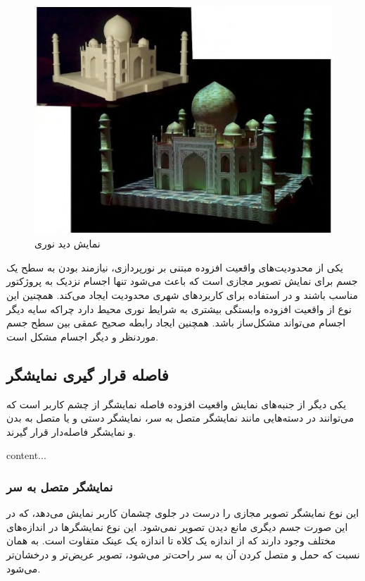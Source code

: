 \begin{figure}
	\centering
	\includegraphics[width=1\linewidth]{image/tajmahal}
	\caption {نمایش دید نوری \cite{Mistry}}
	\label{fig:tajmahal}
\end{figure}

یکی از محدودیت‌های واقعیت افزوده مبتنی بر نورپردازی، نیازمند بودن به سطح یک جسم برای نمایش تصویر مجازی است که باعث می‌شود تنها اجسام نزدیک به پروژکتور مناسب باشند و در استفاده برای کاربردهای شهری محدودیت ایجاد می‌کند. همچنین این نوع از واقعیت افزوده وابستگی بیشتری به شرایط نوری محیط دارد چراکه سایه دیگر اجسام می‌تواند مشکل‌ساز باشد. همچنین ایجاد رابطه صحیح عمقی بین سطح جسم موردنظر و دیگر اجسام مشکل است.

\subsection{فاصله قرار گیری نمایشگر}
یکی دیگر از جنبه‌های نمایش واقعیت افزوده فاصله نمایشگر از چشم کاربر است که می‌توانند در دسته‌هایی مانند نمایشگر متصل به سر، نمایشگر دستی و یا متصل به بدن و نمایشگر فاصله‌دار قرار گیرند.

	content...

\subsubsection{نمایشگر متصل به سر}
این نوع نمایشگر تصویر مجازی را درست در جلوی چشمان کاربر نمایش می‌دهد، که در این صورت جسم دیگری مانع دیدن تصویر نمی‌شود. این نوع نمایشگرها در اندازه‌های مختلف وجود دارند که از اندازه یک کلاه تا اندازه یک عینک متفاوت است. به همان نسبت که حمل و متصل کردن آن به سر راحت‌تر می‌شود، تصویر عریض‌تر و درخشان‌تر می‌شود\cite{Billinghurst}.
